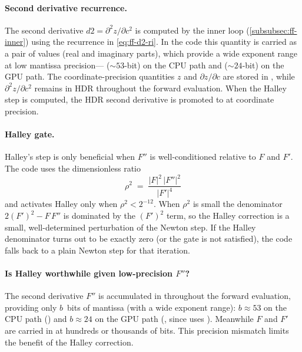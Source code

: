 \paragraph{Second derivative recurrence.}
The second derivative $d2 = \partial^2 z/\partial c^2$ is computed by the
inner loop (\cref{subsubsec:ff-inner}) using the recurrence in
\cref{eq:ff-d2-ri}.  In the code this quantity is carried as a pair of
 values (real and imaginary parts), which provide a
wide exponent range at low mantissa precision---
(${\sim}53$-bit) on the CPU path and 
(${\sim}24$-bit) on the GPU path.  The coordinate-precision
quantities $z$ and $\partial z/\partial c$ are stored in ,
while $\partial^2 z/\partial c^2$ remains in HDR throughout the forward
evaluation.  When the Halley step is computed, the HDR second
derivative is promoted to  at coordinate precision.

\paragraph{Halley gate.}
Halley's step is only beneficial when $F''$ is well-conditioned relative to
$F$ and $F'$.  The code uses the dimensionless ratio
\begin{equation}\label{eq:ff-halley-gate}
\rho^2 \;=\;
  \frac{|F|^2\,|F''|^2}{|F'|^4}
\end{equation}
and activates Halley only when $\rho^2 < 2^{-12}$.  When $\rho^2$ is
small the denominator $2(F')^2 - F\,F''$ is dominated by the $(F')^2$ term,
so the Halley correction is a small, well-determined perturbation of the
Newton step.  If the Halley denominator turns out to be exactly zero (or the
gate is not satisfied), the code falls back to a plain Newton step for that
iteration.

\paragraph{Is Halley worthwhile given low-precision $F''$?}
The second derivative $F''$ is accumulated in 
throughout the forward evaluation, providing only $b$~bits of
mantissa (with a wide exponent range): $b \approx 53$ on the CPU path
() and $b \approx 24$ on the GPU path
(, since  uses
).  Meanwhile $F$ and $F'$ are carried in
 at hundreds or thousands of bits.  This precision mismatch
limits the benefit of the Halley correction.

